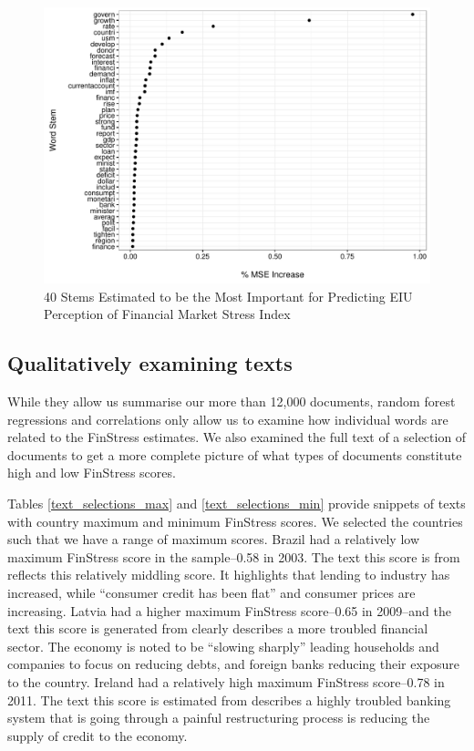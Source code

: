 \documentclass[]{article}
\begin{document}
\begin{figure}
    \caption{40 Stems Estimated to be the Most Important for Predicting EIU Perception of Financial Market Stress Index}
    \label{rf_importance}

    \begin{center}
        \includegraphics[scale=0.5]{figures/rf_stem_importance.pdf}
    \end{center}

\end{figure}





\subsection{Qualitatively examining texts}

While they allow us summarise our more than 12,000 documents, random forest regressions and correlations only allow us to examine how individual words are related to the FinStress estimates. We also examined the full text of a selection of documents to get a more complete picture of what types of documents constitute high and low FinStress scores.

Tables \ref{text_selections_max} and \ref{text_selections_min} provide snippets of texts with country maximum and minimum FinStress scores. We selected the countries such that we have a range of maximum scores. Brazil had a relatively low maximum FinStress score in the sample--0.58 in 2003. The text this score is from reflects this relatively middling score. It highlights that lending to industry has increased, while ``consumer credit has been flat'' and consumer prices are increasing. Latvia had a higher maximum FinStress score--0.65 in 2009--and the text this score is generated from clearly describes a more troubled financial sector. The economy is noted to be ``slowing sharply'' leading households and companies to focus on reducing debts, and foreign banks reducing their exposure to the country. Ireland had a relatively high maximum FinStress score--0.78 in 2011. The text this score is estimated from describes a highly troubled banking system that is going through a painful restructuring process  is reducing the supply of credit to the economy.
\end{document}
